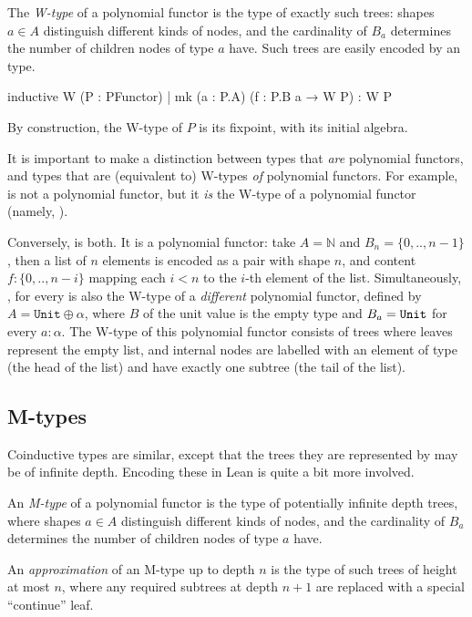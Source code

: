 The \emph{W-type} of a polynomial functor  is the type of exactly such trees: shapes $a ∈ A$ distinguish different kinds of nodes, and the cardinality of $B_a$ determines the number of children nodes of type $a$ have. Such trees are easily encoded by an \inductive{} type.

\begin{leancode}
    inductive W (P : PFunctor)
    | mk (a : P.A) (f : P.B a → W P) : W P
\end{leancode}

By construction, the W-type of $P$ is its fixpoint, with  its initial algebra.

It is important to make a distinction between types that \emph{are} polynomial functors, and types that are (equivalent to) W-types \emph{of} polynomial functors. 
For example,  is not a polynomial functor, but it \emph{is} the W-type of a polynomial functor (namely, ). 

Conversely,  is both. It is a polynomial functor: take $A = \mathbb{N}$ and $B_n = \{0,..,n-1\}$, then a list of $n$ elements is encoded as a pair with shape $n$, and content $f : \{0,..,n-i\}$ mapping each $i < n$ to the $i$-th element of the list. 
Simultaneously, , for every  is also the W-type of a \emph{different} polynomial functor, defined by $A = \texttt{Unit} ⊕ α$, where $B$ of the unit value is the empty type and $B_a = \lean{Unit}$ for every $a : α$. The W-type of this polynomial functor consists of trees where leaves represent the empty list, and internal nodes are labelled with an element of type  (the head of the list) and have exactly one subtree (the tail of the list).

\subsection*{M-types}
Coinductive types are similar, except that the trees they are represented by may be of infinite depth. Encoding these in Lean is quite a bit more involved.

An \emph{M-type} of a polynomial functor  is the type of potentially infinite depth trees, where shapes $a ∈ A$ distinguish different kinds of nodes, and the cardinality of $B_a$ determines the number of children nodes of type $a$ have.

An \emph{approximation} of an M-type up to depth $n$ is the type of such trees of height at most $n$, where any required subtrees at depth $n+1$ are replaced with a special ``continue'' leaf. 

